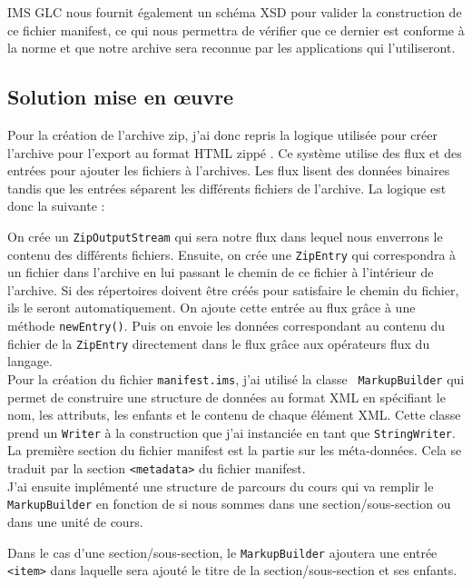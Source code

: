 IMS GLC nous fournit également un schéma XSD pour valider la construction de ce
fichier manifest, ce qui nous permettra de vérifier que ce dernier est conforme
à la norme et que notre archive sera reconnue par les applications qui
l'utiliseront.

\subsection{Solution mise en \oe uvre}
Pour la création de l'archive zip, j'ai donc repris la logique utilisée pour
créer l'archive pour l'export au format HTML \og zippé \fg{}. Ce système utilise
des flux et des entrées pour ajouter les fichiers à l'archives. Les flux lisent
des données binaires tandis que les entrées séparent les différents fichiers de
l'archive. La logique est donc la suivante : 

On crée un {\tt ZipOutputStream}
qui sera notre flux dans lequel nous enverrons le contenu des différents
fichiers. Ensuite, on crée une {\tt ZipEntry} qui correspondra à un fichier dans
l'archive en lui passant le chemin de ce fichier à l'intérieur de l'archive. Si
des répertoires doivent être créés pour satisfaire le chemin du fichier, ils le
seront automatiquement. On ajoute cette entrée au flux grâce à une méthode
{\tt newEntry()}. Puis on envoie les données correspondant au contenu du
fichier de la {\tt ZipEntry} directement dans le flux grâce aux opérateurs
flux du langage.\\

Pour la création du fichier {\tt manifest.ims}, j'ai utilisé la classe {\tt
MarkupBuilder} qui permet de construire une structure de données au
format XML en spécifiant le nom, les attributs, les enfants et le contenu de
chaque élément XML. Cette classe prend un {\tt Writer} à la construction que
j'ai instanciée en tant que {\tt StringWriter}.\\

La première section du fichier manifest est la partie sur les méta-données. Cela
se traduit par la section {\tt <metadata>} du fichier manifest.\\

J'ai ensuite implémenté une structure de parcours du cours qui va remplir le
{\tt MarkupBuilder} en fonction de si nous sommes dans une section/sous-section
ou dans une unité de cours. 

Dans le cas d'une section/sous-section, le {\tt MarkupBuilder} ajoutera une
entrée {\tt <item>} dans laquelle sera ajouté le titre de la
section/sous-section et ses enfants.

